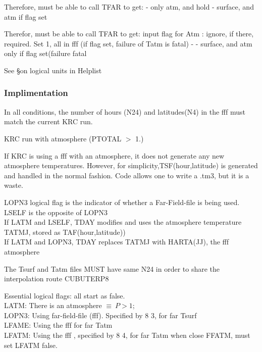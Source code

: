 Therefore, must be able to call TFAR to get:
 \qi - only atm, and hold
\qi - surface, and atm if flag set

Therefor, must be able to call TFAR to get:
input flag for Atm : ignore, if there, required.
 \qi Set 1, all in fff (if flag set, failure of Tatm is fatal)
\qi -
\qi - surface, and atm only if flag set(failure fatal

See \S on logical units in Helplist



\subsubsection{Implimentation}

In all conditions, the number of hours (N24) and latitudes(N4) in the fff must match the current KRC run.

KRC run with atmosphere (PTOTAL $>$ 1.)

 If KRC is using a fff with an atmosphere, it does not generate any new
 atmosphere temperatures. However, for simplicity,TSF(hour,latitude) is
 generated and handled in the normal fashion. Code allows one to write a .tm3,
 but it is a waste.

LOPN3 logical flag is the indicator of whether a Far-Field-file is being used.
\qi LSELF is the opposite of LOPN3
 \\ If  LATM and LSELF, TDAY modifies and uses the atmosphere temperature TATMJ,
 stored as TAF(hour,latitude))
 \\ If  LATM and LOPN3, TDAY replaces TATMJ with HARTA(JJ), the fff atmosphere


 The Tsurf and Tatm files MUST have same N24 in order to share the interpolation route CUBUTERP8
\pagebreak

Essential logical flags: all start as false.
\\ LATM: There is an atmosphere $\equiv \ P>1$; 
\\ LOPN3: Using far-field-file (fff). Specified by 8 3,  for far Tsurf
\\ LFAME: Using the fff   for far Tatm
\\ LFATM: Using the fff  , specified by 8 4, for far Tatm
\qi when close FFATM, must set LFATM false.

